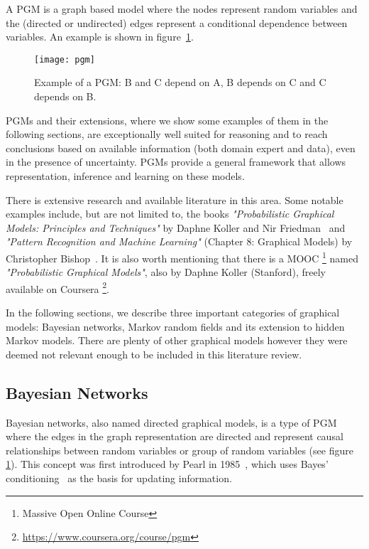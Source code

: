 A PGM is a graph based model where the nodes represent random variables and the 
(directed or undirected) edges represent a conditional dependence between 
variables. An example is shown in figure~\ref{fig:pgm}.

\begin{figure}[h]
    \begin{center}
        \leavevmode
        \texttt{[image: pgm]}
        \caption{Example of a PGM: B and C depend on A, B depends on C and C 
            depends on B.}
        \label{fig:pgm}
    \end{center}
\end{figure}

PGMs and their extensions, where we show some examples of them in the following 
sections, are exceptionally well suited for reasoning and to reach conclusions 
based on available information (both domain expert and data), even in the 
presence of uncertainty. PGMs provide a general framework that allows 
representation, inference and learning on these 
models.~\cite{koller2009probabilistic}

There is extensive research and available literature in this area. Some notable 
examples include, but are not limited to, the books \textit{"Probabilistic 
    Graphical Models: Principles and Techniques"} by Daphne Koller and Nir 
Friedman~\cite{koller2009probabilistic} and \textit{"Pattern Recognition and 
    Machine Learning"} (Chapter 8: Graphical Models) by Christopher 
Bishop~\cite{bishop2006pattern}. It is also worth mentioning that there is a 
MOOC \footnote{Massive Open Online Course} named \textit{"Probabilistic 
    Graphical Models"}, also by Daphne Koller (Stanford), freely available on 
Coursera \footnote{\url{https://www.coursera.org/course/pgm}}.

In the following sections, we describe three important categories of graphical 
models: Bayesian networks, Markov random fields and its extension to hidden 
Markov models. There are plenty of other graphical models however they were 
deemed not relevant enough to be included in this literature review.

\subsection{Bayesian Networks}

Bayesian networks, also named directed graphical models, is a type of PGM where 
the edges in the graph representation are directed and represent causal 
relationships between random variables or group of random variables (see figure 
\ref{fig:pgm}). This concept was first introduced by Pearl in 
1985~\cite{Pearl1985}, which uses Bayes' conditioning~\cite{bayes1763essay} as 
the basis for updating information.

